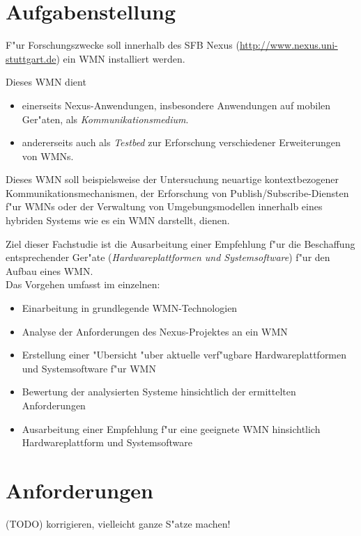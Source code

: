 \section{Aufgabenstellung}

F"ur Forschungszwecke soll innerhalb des SFB Nexus
(\url{http://www.nexus.uni-stuttgart.de}) 
ein WMN installiert werden. 

Dieses WMN dient 
\begin{itemize}
	\item einerseits Nexus-Anwendungen, insbesondere Anwendungen 
	auf mobilen Ger"aten, als \emph{Kommunikationsmedium}. 

	\item andererseits auch als \emph{Testbed} 
	zur Erforschung verschiedener Erweiterungen von WMNs.
\end{itemize}

Dieses WMN soll beispielsweise der Untersuchung neuartige kontextbezogener 
Kommunikationsmechanismen, der Erforschung von 
Publish/Subscribe-Diensten f"ur WMNs oder der 
Verwaltung von Umgebungsmodellen innerhalb eines 
hybriden Systems wie es ein WMN darstellt, dienen.

Ziel dieser Fachstudie ist die Ausarbeitung einer 
Empfehlung f"ur die Beschaffung entsprechender Ger"ate 
(\emph{Hardwareplattformen und Systemsoftware}) f"ur
den Aufbau eines WMN. \\

Das Vorgehen umfasst im einzelnen:

\begin{itemize}
	
	\item Einarbeitung in grundlegende WMN-Technologien
	\item Analyse der Anforderungen des Nexus-Projektes an ein WMN
	\item Erstellung einer "Ubersicht "uber aktuelle verf"ugbare 
	Hardwareplattformen und Systemsoftware f"ur WMN
	\item Bewertung der analysierten Systeme hinsichtlich 
	der ermittelten Anforderungen 	
	\item Ausarbeitung einer Empfehlung f"ur eine geeignete 
	WMN hinsichtlich Hardwareplattform und Systemsoftware
	
\end{itemize}


\section{Anforderungen}
(TODO) korrigieren, vielleicht ganze S"atze machen!

